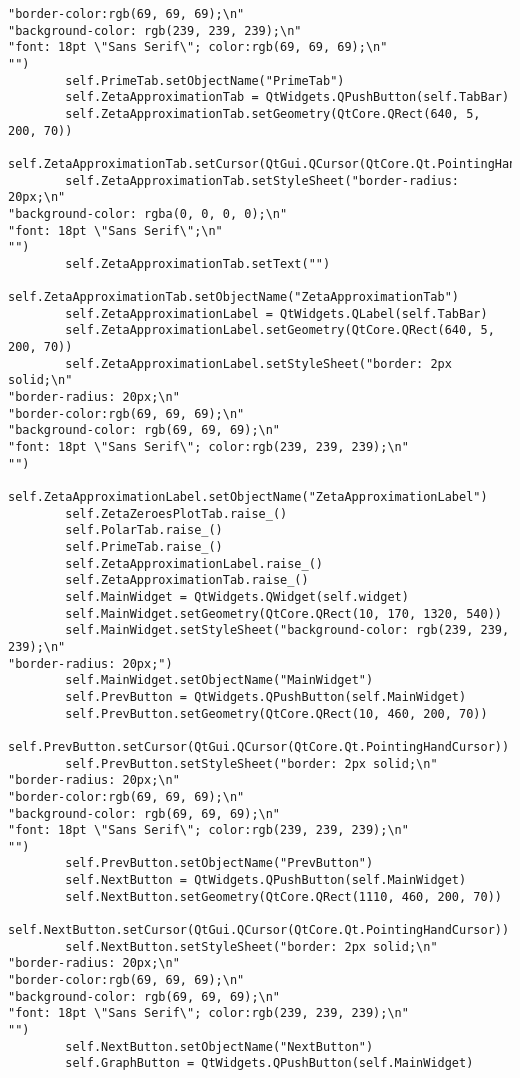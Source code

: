 \documentclass{article}
\begin{document}
\begin{lstlisting}
"border-color:rgb(69, 69, 69);\n"
"background-color: rgb(239, 239, 239);\n"
"font: 18pt \"Sans Serif\"; color:rgb(69, 69, 69);\n"
"")
        self.PrimeTab.setObjectName("PrimeTab")
        self.ZetaApproximationTab = QtWidgets.QPushButton(self.TabBar)
        self.ZetaApproximationTab.setGeometry(QtCore.QRect(640, 5, 200, 70))
        self.ZetaApproximationTab.setCursor(QtGui.QCursor(QtCore.Qt.PointingHandCursor))
        self.ZetaApproximationTab.setStyleSheet("border-radius: 20px;\n"
"background-color: rgba(0, 0, 0, 0);\n"
"font: 18pt \"Sans Serif\";\n"
"")
        self.ZetaApproximationTab.setText("")
        self.ZetaApproximationTab.setObjectName("ZetaApproximationTab")
        self.ZetaApproximationLabel = QtWidgets.QLabel(self.TabBar)
        self.ZetaApproximationLabel.setGeometry(QtCore.QRect(640, 5, 200, 70))
        self.ZetaApproximationLabel.setStyleSheet("border: 2px solid;\n"
"border-radius: 20px;\n"
"border-color:rgb(69, 69, 69);\n"
"background-color: rgb(69, 69, 69);\n"
"font: 18pt \"Sans Serif\"; color:rgb(239, 239, 239);\n"
"")
        self.ZetaApproximationLabel.setObjectName("ZetaApproximationLabel")
        self.ZetaZeroesPlotTab.raise_()
        self.PolarTab.raise_()
        self.PrimeTab.raise_()
        self.ZetaApproximationLabel.raise_()
        self.ZetaApproximationTab.raise_()
        self.MainWidget = QtWidgets.QWidget(self.widget)
        self.MainWidget.setGeometry(QtCore.QRect(10, 170, 1320, 540))
        self.MainWidget.setStyleSheet("background-color: rgb(239, 239, 239);\n"
"border-radius: 20px;")
        self.MainWidget.setObjectName("MainWidget")
        self.PrevButton = QtWidgets.QPushButton(self.MainWidget)
        self.PrevButton.setGeometry(QtCore.QRect(10, 460, 200, 70))
        self.PrevButton.setCursor(QtGui.QCursor(QtCore.Qt.PointingHandCursor))
        self.PrevButton.setStyleSheet("border: 2px solid;\n"
"border-radius: 20px;\n"
"border-color:rgb(69, 69, 69);\n"
"background-color: rgb(69, 69, 69);\n"
"font: 18pt \"Sans Serif\"; color:rgb(239, 239, 239);\n"
"")
        self.PrevButton.setObjectName("PrevButton")
        self.NextButton = QtWidgets.QPushButton(self.MainWidget)
        self.NextButton.setGeometry(QtCore.QRect(1110, 460, 200, 70))
        self.NextButton.setCursor(QtGui.QCursor(QtCore.Qt.PointingHandCursor))
        self.NextButton.setStyleSheet("border: 2px solid;\n"
"border-radius: 20px;\n"
"border-color:rgb(69, 69, 69);\n"
"background-color: rgb(69, 69, 69);\n"
"font: 18pt \"Sans Serif\"; color:rgb(239, 239, 239);\n"
"")
        self.NextButton.setObjectName("NextButton")
        self.GraphButton = QtWidgets.QPushButton(self.MainWidget)

\end{lstlisting}
\end{document}
